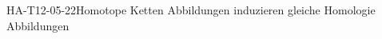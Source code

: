 
\begin{PROP}{HA-T12-05-22}{Homotope Ketten Abbildungen induzieren gleiche Homologie Abbildungen}
\end{PROP}
